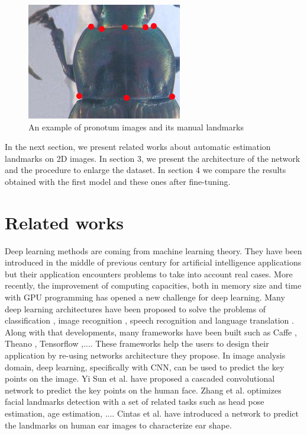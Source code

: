 \documentclass[10pt]{article}
\begin{document}
\begin{figure}[htbp]
\centering
	\centerline{\includegraphics[scale=0.7]{images/pronotum}}
	\caption{\small{An example of pronotum images and its manual landmarks}}
	\label{figpronotum}
\end{figure}

In the next section, we present related works about automatic
estimation landmarks on 2D images. In section $3$, we present the
architecture of the network and the procedure to enlarge the dataset. In section $4$ we compare the results obtained with the first
model and these ones after fine-tuning. 


\section{Related works}
Deep learning methods are coming from machine learning theory. They
have been introduced in the middle of previous century for artificial
intelligence applications but their application encounters problems to
take into account real cases. More recently, the improvement of computing capacities, both in
memory size and time with GPU programming has opened a new challenge  
for deep learning. Many deep learning architectures have been proposed
to solve the problems of classification \cite{krizhevsky2012imagenet,
  ciregan2012multi}, image recognition \cite{szegedy2015going,
  farabet2013learning, li2015convolutional}, speech recognition
\cite{mikolov2011strategies, hinton2012deep} and language translation
\cite{jean2014using, sutskever2014sequence}. Along with that
developments, many frameworks have been built such as Caffe
\cite{jia2014caffe}, Theano \cite{2016arXiv160502688short}, Tensorflow
\cite{tensorflow2015},.... These frameworks help
the users to design their application by re-using networks
architecture they propose. In image analysis domain,
deep learning, specifically with CNN, can be used to predict the key points on
the image. Yi Sun et al. \cite{sun2013deep} have proposed a cascaded
convolutional network to predict the key points on the human
face. Zhang et al. \cite{zhang2014facial} optimizes facial landmarks
detection with a set of related tasks such as head pose estimation,
age estimation, .... Cintas et al. \cite{cintas2016automatic} have
introduced a network to predict the landmarks on human ear images to
characterize ear shape.
\end{document}
